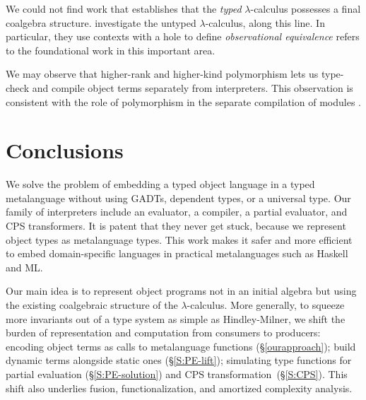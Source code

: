We could not find work that establishes that
the \emph{typed} $\lambda$-calculus possesses a final coalgebra structure.
investigate the untyped $\lambda$-calculus,
along this line.  In particular, they use
contexts with a hole \cite[p.\,13]{honsell99coinductive} to define
\emph{observational equivalence}
 refers to the
foundational work in this important area.  
\begin{comment}
Particularly intriguing is the link to the
coinductive aspects of B\"{o}hm trees, as pointed out by
\cite{berarducci-models} and \cite[Example 4.3.4]{jacobs-coalgebra}.
\end{comment}

\begin{comment}
One way to understand our main idea is to eschew sum types and sum kinds
for their dual, record types and record kinds.
For the self\hyp interpreter, we then proceed to use a Church encoding for
recursive data types \cite{bohm-automatic}.
\end{comment}

We may observe that
higher-rank and higher-kind
polymorphism lets us type-check and compile object terms separately from
interpreters.  This observation is consistent with the role of
polymorphism in the separate compilation of modules
\cite{shao-typed,shao-transparent}.

\section{Conclusions}\label{conclusion}

We solve the problem of embedding a typed object language in a typed
metalanguage without using GADTs, dependent types, or a universal type.
Our family of interpreters include an evaluator, a compiler, a partial
evaluator, and CPS transformers.  It is patent that they never get stuck,
because we represent object types as metalanguage types.  This work
makes it safer and more efficient to embed domain\hyp specific languages
in practical metalanguages such as Haskell and ML\@.

Our main idea is to represent object programs not in an initial algebra
but using the existing coalgebraic structure of the $\lambda$-calculus.
More generally, to squeeze more invariants out of a type system as
simple as Hindley-Milner, we shift the burden of representation and
computation from consumers to producers: encoding object terms as calls
to metalanguage functions (\S\ref{ourapproach}); build dynamic terms
alongside static ones (\S\ref{S:PE-lift}); simulating type functions for
partial evaluation (\S\ref{S:PE-solution}) and CPS
transformation~(\S\ref{S:CPS}).  This shift also underlies fusion,
functionalization, and amortized complexity analysis.

